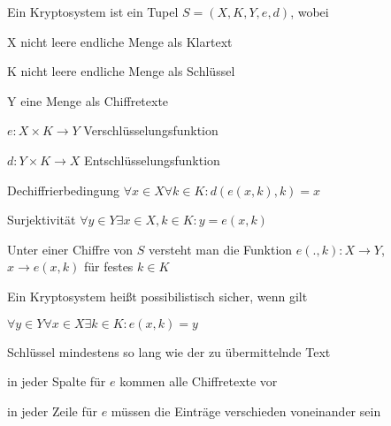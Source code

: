 \documentclass[avery5371, frame]{flashcards}
\begin{document}

\begin{flashcard}[Kryptosysteme]{Ein Kryptosystem ist ein Tupel $S=(X,K,Y,e,d)$, wobei}
    \begin{itemize*}
        \item X nicht leere endliche Menge als Klartext
        \item K nicht leere endliche Menge als Schlüssel
        \item Y eine Menge als Chiffretexte
        \item $e:X\times K\rightarrow Y$ Verschlüsselungsfunktion
        \item $d:Y\times K\rightarrow X$ Entschlüsselungsfunktion
    \end{itemize*}
\end{flashcard}


\begin{flashcard}[Kryptosysteme]{Dechiffrierbedingung}
    $\forall x\in X\forall k\in K:d(e(x,k),k) =x$
\end{flashcard}

\begin{flashcard}[Kryptosysteme]{Surjektivität}
    $\forall y\in Y\exists x\in X,k\in K:y=e(x,k)$
\end{flashcard}

\begin{flashcard}[Kryptosysteme]{Unter einer Chiffre von $S$ versteht man}
    die Funktion $e(.,k):X\rightarrow Y$, $x\rightarrow e(x,k)$ für festes $k\in K$
\end{flashcard}

\begin{flashcard}[Kryptosysteme]{Ein Kryptosystem heißt possibilistisch sicher, wenn gilt}
    \begin{itemize*}
        \item $\forall y\in Y\forall x\in X\exists k\in K:e(x,k)=y$
        \item Schlüssel mindestens so lang wie der zu übermittelnde Text
        \item in jeder Spalte für $e$ kommen alle Chiffretexte vor
        \item in jeder Zeile für $e$ müssen die Einträge verschieden voneinander sein
    \end{itemize*}
\end{flashcard}
\end{document}
